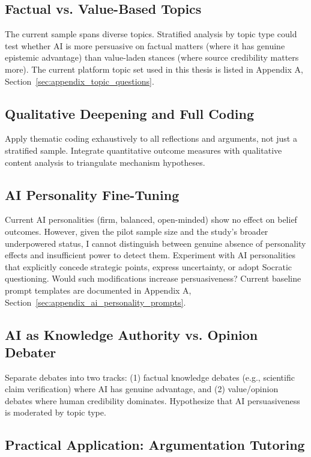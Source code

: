 \subsection{Factual vs. Value-Based Topics}

The current sample spans diverse topics. Stratified analysis by topic type
could test whether AI is more persuasive on factual matters (where it has genuine epistemic advantage)
than value-laden stances (where source credibility matters more). The current
platform topic set used in this thesis is listed in Appendix A,
Section~\ref{sec:appendix_topic_questions}.

\subsection{Qualitative Deepening and Full Coding}

Apply thematic coding exhaustively to all reflections and arguments, not just a stratified sample.
Integrate quantitative outcome measures with qualitative content analysis to triangulate mechanism hypotheses.

\subsection{AI Personality Fine-Tuning}

Current AI personalities (firm, balanced, open-minded) show no effect on belief outcomes.
However, given the pilot sample size and the study's broader underpowered status,
I cannot distinguish between genuine absence of personality effects and insufficient power to detect them.
Experiment with AI personalities that explicitly concede strategic points, express uncertainty, or
adopt Socratic questioning. Would such modifications increase persuasiveness?
Current baseline prompt templates are documented in Appendix A,
Section~\ref{sec:appendix_ai_personality_prompts}.

\subsection{AI as Knowledge Authority vs. Opinion Debater}

Separate debates into two tracks: (1) factual knowledge debates (e.g., scientific claim verification)
where AI has genuine advantage, and (2) value/opinion debates where human credibility dominates.
Hypothesize that AI persuasiveness is moderated by topic type.

\subsection{Practical Application: Argumentation Tutoring}

